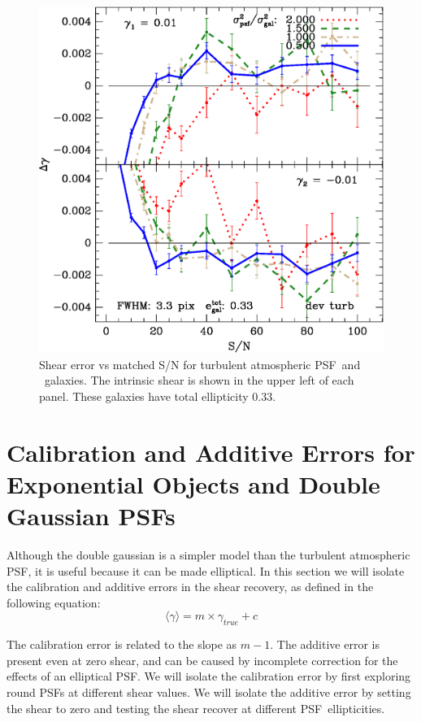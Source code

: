 \documentclass[10pt,preprint]{aastex}
\newcommand{\psf}{PSF}
\begin{document}
\begin{figure}[t] \centering \centering
\includegraphics[scale=0.7]{figures/gmix-fit-dt03r03r04-yr-0.005-0.005-diff.eps}

 \caption{Shear error vs matched S/N for turbulent atmospheric \psf\
 and \devauc\ galaxies. The intrinsic shear is shown in the upper left of
 each panel.  These galaxies have total ellipticity 0.33.
 \label{fig:dt03r03r04}}

\end{figure}




\section{Calibration and Additive Errors for Exponential Objects and Double
Gaussian \psf s}

Although the double gaussian is a simpler model than the turbulent atmospheric
\psf, it is useful because it can be made elliptical.  In this section we
will isolate the calibration and additive errors in the shear recovery, as defined
in the following equation:
\begin{equation}
\langle \gamma \rangle = m\times \gamma_{true} + c
\end{equation}

The calibration error is related to the slope as $m-1$.  The additive error is
present even at zero shear, and can be caused by incomplete correction for the
effects of an elliptical \psf.  We will isolate the calibration error by first
exploring round \psf s at different shear values.  We will isolate the additive
error by setting the shear to zero and testing the shear recover at different
\psf\ ellipticities.
\end{document}
